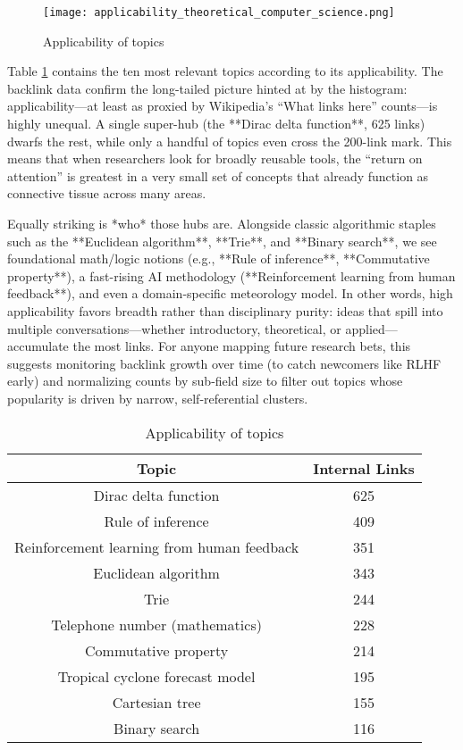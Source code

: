\begin{figure}[h]
\centering\texttt{[image: applicability\_theoretical\_computer\_science.png]}
\caption{\label{fig:Applicability-of-Topics}Applicability of topics}
\end{figure}

Table \ref{tab:Applicability-of-Topics} contains the ten most relevant topics according to its applicability. The backlink data confirm the long-tailed picture hinted at by the histogram: applicability—at least as proxied by Wikipedia’s “What links here” counts—is highly unequal. A single super-hub (the **Dirac delta function**, 625 links) dwarfs the rest, while only a handful of topics even cross the 200-link mark. This means that when researchers look for broadly reusable tools, the “return on attention” is greatest in a very small set of concepts that already function as connective tissue across many areas.

Equally striking is *who* those hubs are. Alongside classic algorithmic staples such as the **Euclidean algorithm**, **Trie**, and **Binary search**, we see foundational math/logic notions (e.g., **Rule of inference**, **Commutative property**), a fast-rising AI methodology (**Reinforcement learning from human feedback**), and even a domain-specific meteorology model. In other words, high applicability favors breadth rather than disciplinary purity: ideas that spill into multiple conversations—whether introductory, theoretical, or applied—accumulate the most links. For anyone mapping future research bets, this suggests monitoring backlink growth over time (to catch newcomers like RLHF early) and normalizing counts by sub-field size to filter out topics whose popularity is driven by narrow, self-referential clusters.

\begin{table}
\begin{centering}
\begin{tabular}{|c|c|}
\hline 
Topic & Internal Links \tabularnewline
\hline
\hline
Dirac delta function & 625\tabularnewline
\hline
Rule of inference & 409\tabularnewline
\hline
Reinforcement learning from human feedback & 351\tabularnewline
\hline
Euclidean algorithm & 343\tabularnewline
\hline
Trie & 244\tabularnewline
\hline
Telephone number (mathematics) & 228\tabularnewline
\hline
Commutative property & 214\tabularnewline
\hline
Tropical cyclone forecast model & 195\tabularnewline
\hline
Cartesian tree & 155\tabularnewline
\hline
Binary search & 116\tabularnewline
\hline 
\end{tabular}
\par\end{centering}
\caption{\label{tab:Applicability-of-Topics}Applicability of topics}
\end{table}

